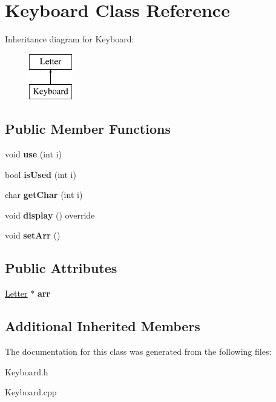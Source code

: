 \hypertarget{class_keyboard}{}\section{Keyboard Class Reference}
\label{class_keyboard}
Inheritance diagram for Keyboard\+:\begin{figure}[H]
\begin{center}
\leavevmode
\includegraphics[height=2.000000cm]{class_keyboard}
\end{center}
\end{figure}
\subsection*{Public Member Functions}
\begin{DoxyCompactItemize}
\item 
\hypertarget{class_keyboard_ab709f4e952b99660d72624f0493016e4}{}\label{class_keyboard_ab709f4e952b99660d72624f0493016e4} 
void {\bfseries use} (int i)
\item 
\hypertarget{class_keyboard_a1857f3cb6f908638aa6296285fc15e9e}{}\label{class_keyboard_a1857f3cb6f908638aa6296285fc15e9e} 
bool {\bfseries is\+Used} (int i)
\item 
\hypertarget{class_keyboard_a4d7628f0662938e4f41cd49acc659224}{}\label{class_keyboard_a4d7628f0662938e4f41cd49acc659224} 
char {\bfseries get\+Char} (int i)
\item 
\hypertarget{class_keyboard_aed02d9f56fb12f4cec1129de092913d1}{}\label{class_keyboard_aed02d9f56fb12f4cec1129de092913d1} 
void {\bfseries display} () override
\item 
\hypertarget{class_keyboard_a5b4f3bd7c70e78197c806d1d81f499fe}{}\label{class_keyboard_a5b4f3bd7c70e78197c806d1d81f499fe} 
void {\bfseries set\+Arr} ()
\end{DoxyCompactItemize}
\subsection*{Public Attributes}
\begin{DoxyCompactItemize}
\item 
\hypertarget{class_keyboard_adf2f8d421d24de89f1e54fe7a17d2741}{}\label{class_keyboard_adf2f8d421d24de89f1e54fe7a17d2741} 
\hyperlink{class_letter}{Letter} $\ast$ {\bfseries arr}
\end{DoxyCompactItemize}
\subsection*{Additional Inherited Members}


The documentation for this class was generated from the following files\+:\begin{DoxyCompactItemize}
\item 
Keyboard.\+h\item 
Keyboard.\+cpp\end{DoxyCompactItemize}

